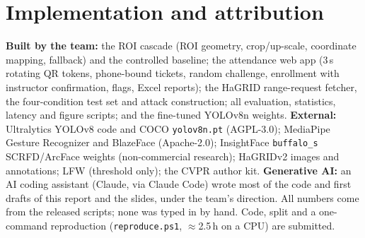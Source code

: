 \section{Implementation and attribution}
\label{sec:impl}

\noindent\textbf{Built by the team:} the ROI cascade (ROI geometry, crop/up-scale, coordinate mapping, fallback)
and the controlled baseline; the attendance web app (3\,s rotating QR tokens, phone-bound tickets, random
challenge, enrollment with instructor confirmation, flags, Excel reports); the HaGRID range-request fetcher, the
four-condition test set and attack construction; all evaluation, statistics, latency and figure scripts; and the
fine-tuned YOLOv8n weights.
\textbf{External:} Ultralytics YOLOv8 code and COCO \texttt{yolov8n.pt} (AGPL-3.0); MediaPipe Gesture
Recognizer and BlazeFace (Apache-2.0); InsightFace \texttt{buffalo\_s} SCRFD/ArcFace weights (non-commercial
research); HaGRIDv2 images and annotations; LFW (threshold only); the CVPR author kit.
\textbf{Generative AI:} an AI coding assistant (Claude, via Claude Code) wrote most of the code and first drafts
of this report and the slides, under the team's direction. All numbers come from the released scripts; none
was typed in by hand.
Code, split and a one-command reproduction (\texttt{reproduce.ps1}, $\approx$2.5\,h on a CPU) are submitted.
